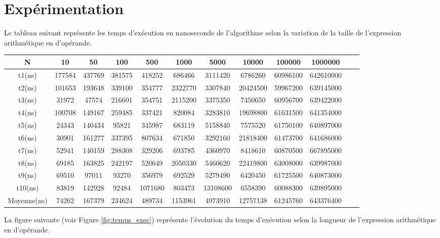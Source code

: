 \section{Expérimentation}
Le tableau suivant représente les temps d'exécution en nanoseconde de l'algorithme selon la variation de la taille de l'expression arithmétique en d'opérande.\\
\small
\begin{tabular}{| c | c | c | c | c | c | c | c | c | c | c | c |}
    \hline
    N &  10 & 50 & 100 & 500 & 1000 & 5000 & 10000 & 100000 & 1000000 \\
    \hline
    t1(ns) & 177584 & 437769 & 381575 & 418252 & 686466 & 3111420 & 6786260 & 60986100 & 642610000 \\
    \hline
    t2(ns) & 101653 & 193648 & 339100 & 354777 & 2322770 & 3307840 & 20424500 & 59967200 & 639145000 \\
    \hline
    t3(ns) & 31972 & 47574 & 216601 & 354751 & 2115200 & 3375350 & 7450650 & 60956700 & 639422000 \\
    \hline
    t4(ns) & 100708 & 149167 & 259485 & 337421 & 820084 & 3283810 & 19698800 & 61631500 & 641354000 \\
    \hline
    t5(ns) & 24343 & 140434 & 95821 & 345987 & 683119 & 5158840 & 7575520 & 61750100 & 640897000 \\
    \hline
    t6(ns) & 30901 & 161277 & 337395 & 807634 & 671850 & 3292160 & 21818400 & 61473700 & 641686000 \\
    \hline
    t7(ns) & 52941 & 140159 & 288308 & 329206 & 693785 & 4360970 & 8418610 & 60870500 & 667895000 \\
    \hline
    t8(ns) & 69185 & 163825 & 242197 & 520649 & 2050330 & 5460620 & 22419800 & 63008000 & 639987000 \\
    \hline
    t9(ns) & 69510 & 97011 & 93270 & 356979 & 692529 & 5279490 & 6420450 & 61725500 & 640873000 \\
    \hline
    t10(ns) & 83819 & 142928 & 92484 & 1071680 & 803473 & 13108600 & 6558390 & 60088300 & 639895000 \\
    \hline
    Moyenne(ns) & 74262 & 167379 & 234624 & 489734 & 1153961 & 4973910 & 12757138 & 61245760 & 643376400 \\
    \hline
\end{tabular}
\normalsize
\par
La figure suivante (voir Figure \ref{fig:temps_exec}) représente l'évolution du temps d'exécution selon la longueur de l'expression arithmétique en d'opérande.

